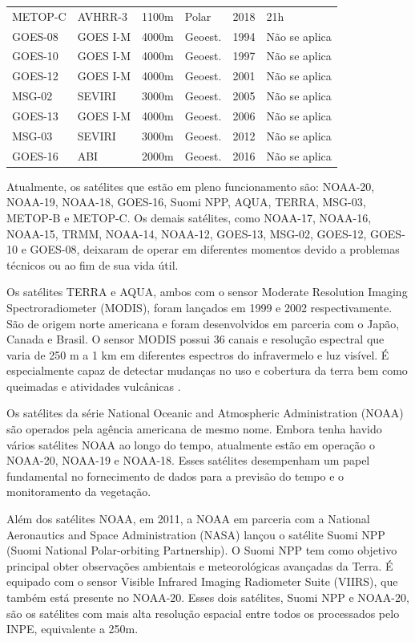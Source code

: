 \documentclass[cic,tc]{iiufrgs}
\begin{document}
\begin{table}[htbp]
\begin{tabular}{ @{}llllcl@{} }
  METOP-C & AVHRR-3  & 1100m       & Polar   & 2018 & 21h \\
  GOES-08 & GOES I-M & 4000m       & Geoest. & 1994 & Não se aplica \\
  GOES-10 & GOES I-M & 4000m       & Geoest. & 1997 & Não se aplica \\
  GOES-12 & GOES I-M & 4000m       & Geoest. & 2001 & Não se aplica \\
  MSG-02  & SEVIRI   & 3000m       & Geoest. & 2005 & Não se aplica \\
  GOES-13 & GOES I-M & 4000m       & Geoest. & 2006 & Não se aplica \\
  MSG-03  & SEVIRI   & 3000m       & Geoest. & 2012 & Não se aplica \\
  GOES-16 & ABI      & 2000m       & Geoest. & 2016 & Não se aplica \\
  \bottomrule
\end{tabular}
\label{table:satelites}
\end{table}

Atualmente, os satélites que estão em pleno funcionamento são: NOAA-20, NOAA-19, NOAA-18, GOES-16, Suomi NPP, AQUA, TERRA, MSG-03, METOP-B e METOP-C. Os demais satélites, como NOAA-17, NOAA-16, NOAA-15, TRMM, NOAA-14, NOAA-12, GOES-13, MSG-02, GOES-12, GOES-10 e GOES-08, deixaram de operar em diferentes momentos devido a problemas técnicos ou ao fim de sua vida útil.

Os satélites TERRA e AQUA, ambos com o sensor Moderate Resolution Imaging Spectroradiometer (MODIS), foram lançados em 1999 e 2002 respectivamente. São de origem norte americana e foram desenvolvidos em parceria com o Japão, Canada e Brasil. O sensor MODIS possui 36 canais e resolução espectral que varia de 250 m a 1 km em diferentes espectros do infravermelo e luz visível. É especialmente capaz de detectar mudanças no uso e cobertura da terra bem como queimadas e atividades vulcânicas \citep{latorre2003}.

Os satélites da série National Oceanic and Atmospheric Administration (NOAA) são operados pela agência americana de mesmo nome. Embora tenha havido vários satélites NOAA ao longo do tempo, atualmente estão em operação o NOAA-20, NOAA-19 e NOAA-18. Esses satélites desempenham um papel fundamental no fornecimento de dados para a previsão do tempo e o monitoramento da vegetação. 

Além dos satélites NOAA, em 2011, a NOAA em parceria com a National Aeronautics and Space Administration (NASA) lançou o satélite Suomi NPP (Suomi National Polar-orbiting Partnership). O Suomi NPP tem como objetivo principal obter observações ambientais e meteorológicas avançadas da Terra. É equipado com o sensor Visible Infrared Imaging Radiometer Suite (VIIRS), que também está presente no NOAA-20. Esses dois satélites, Suomi NPP e NOAA-20, são os satélites com mais alta resolução espacial entre todos os processados pelo INPE, equivalente a 250m.
\end{document}
